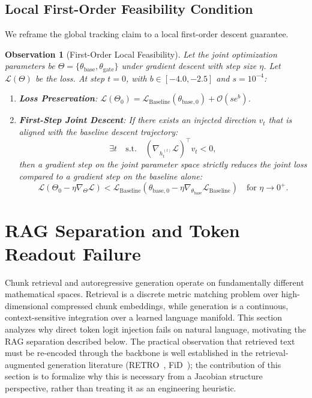 \documentclass[preprint,12pt]{elsarticle}
\newtheorem{observation}[theorem]{Observation}
\begin{document}
\subsection{Local First-Order Feasibility Condition}

We reframe the global tracking claim to a local first-order descent guarantee.

\begin{observation}[First-Order Local Feasibility]
Let the joint optimization parameters be $\Theta = \{\theta_{\text{base}}, \theta_{\text{gate}}\}$ under gradient descent with step size $\eta$. Let $\mathcal{L}(\Theta)$ be the loss. At step $t=0$, with $b \in [-4.0, -2.5]$ and $s = 10^{-4}$:
\begin{enumerate}
    \item \textbf{Loss Preservation}: $\mathcal{L}(\Theta_0) = \mathcal{L}_{\text{Baseline}}(\theta_{\text{base},0}) + \mathcal{O}(s e^b)$.
    \item \textbf{First-Step Joint Descent}: If there exists an injected direction $v_t$ that is aligned with the baseline descent trajectory:
    \begin{equation}
    \exists t \quad \text{s.t.} \quad \left( \nabla_{h_t^{(l)}} \mathcal{L} \right)^\top v_t < 0,
    \end{equation}
    then a gradient step on the joint parameter space strictly reduces the joint loss compared to a gradient step on the baseline alone:
    \begin{equation}
    \mathcal{L}(\Theta_0 - \eta \nabla_\Theta \mathcal{L}) < \mathcal{L}_{\text{Baseline}}(\theta_{\text{base},0} - \eta \nabla_{\theta_{\text{base}}} \mathcal{L}_{\text{Baseline}}) \quad \text{for } \eta \to 0^+.
    \end{equation}
\end{enumerate}
\end{observation}



\section{RAG Separation and Token Readout Failure}
\label{app:proof41}

Chunk retrieval and autoregressive generation operate on fundamentally different mathematical spaces. Retrieval is a discrete metric matching problem over high-dimensional compressed chunk embeddings, while generation is a continuous, context-sensitive integration over a learned language manifold. This section analyzes why direct token logit injection fails on natural language, motivating the RAG separation described below. The practical observation that retrieved text must be re-encoded through the backbone is well established in the retrieval-augmented generation literature (RETRO~\cite{retro}, FiD~\cite{fid}); the contribution of this section is to formalize why this is necessary from a Jacobian structure perspective, rather than treating it as an engineering heuristic.
\end{document}
